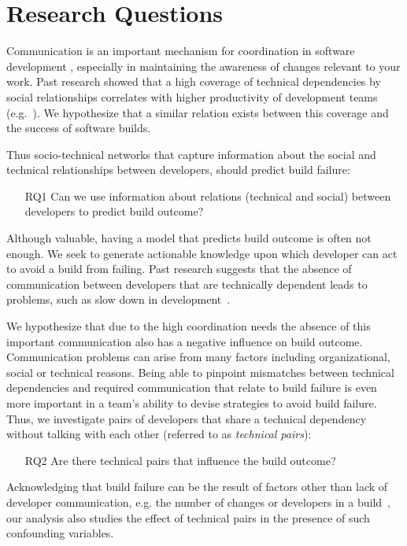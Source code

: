 \documentclass[12pt,oneside]{book}
\begin{document}
\section{Research Questions}
\label{sec:rq}
Communication
is an important mechanism for coordination in software development \cite{curtis:acm:1988,kraut:1995coordination}, especially in maintaining the awareness of changes relevant to your work. Past research showed that a high coverage of technical
dependencies by social relationships correlates with higher productivity of development teams (e.g.~\cite{cataldo:cscw:2006}). 
 We hypothesize that a similar relation
exists between this coverage and the success of software builds. 

Thus
socio-technical networks that capture information about the social and technical
relationships between developers, should predict build failure:

\begin{itemize}
\item[RQ1] Can we use information about relations (technical and social) between
developers to predict build outcome?
\end{itemize}

Although valuable, having a model that predicts build outcome is often not
enough. We seek to generate actionable knowledge upon which developer can act to
avoid a build from failing. Past research suggests that the absence of
communication between developers that are technically dependent leads to
problems, such as slow down in development~\cite{cataldo:esem:2008}.


We hypothesize that due to the high coordination needs the absence of this
important communication also has a negative influence on build outcome. Communication problems can arise from many factors including organizational,
social or technical reasons. Being able to pinpoint
mismatches between technical dependencies and required communication that
relate to build failure is even more important in a team's
ability to devise strategies to avoid build failure. Thus, we
investigate pairs of developers that share a technical dependency without talking
with each other (referred to as \emph{technical pairs}):


\begin{itemize}
\item[RQ2] Are there technical pairs that influence the build outcome?
\end{itemize}

Acknowledging that build failure can be the result
of factors other than lack of developer
communication, e.g. the number of changes or developers in a build~\cite{hassan:ase:2006}, our
analysis also studies the effect of technical pairs in the presence of such
confounding variables. 
\end{document}
